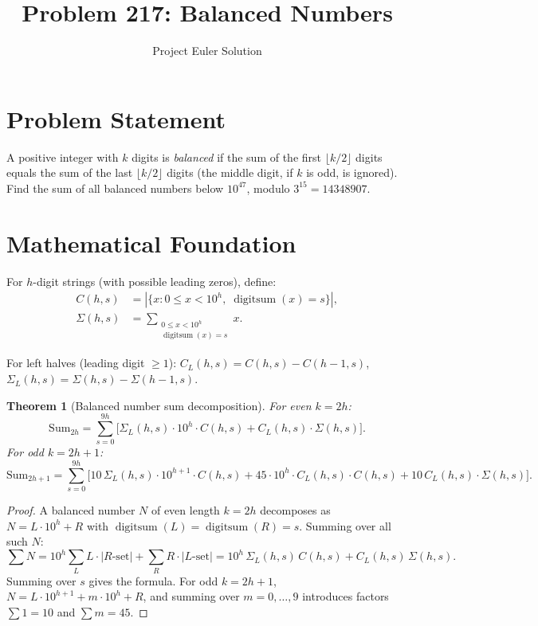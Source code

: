 \documentclass[12pt]{article}
\title{Problem 217: Balanced Numbers}
\author{Project Euler Solution}
\date{}
\newtheorem{theorem}{Theorem}
\begin{document}
\maketitle

\section{Problem Statement}

A positive integer with $k$ digits is \emph{balanced} if the sum of the first $\lfloor k/2\rfloor$ digits equals the sum of the last $\lfloor k/2\rfloor$ digits (the middle digit, if $k$ is odd, is ignored). Find the sum of all balanced numbers below $10^{47}$, modulo $3^{15} = 14348907$.

\section{Mathematical Foundation}

For $h$-digit strings (with possible leading zeros), define:
\begin{align*}
C(h,s) &= |\{x: 0 \leq x < 10^h, \;\operatorname{digitsum}(x) = s\}|, \\
\Sigma(h,s) &= \textstyle\sum_{\substack{0 \leq x < 10^h \\ \operatorname{digitsum}(x)=s}} x.
\end{align*}

For left halves (leading digit $\geq 1$): $C_L(h,s) = C(h,s) - C(h{-}1,s)$, $\Sigma_L(h,s) = \Sigma(h,s) - \Sigma(h{-}1,s)$.

\begin{theorem}[Balanced number sum decomposition]
For even $k = 2h$:
\[
\mathrm{Sum}_{2h} = \sum_{s=0}^{9h}\bigl[\Sigma_L(h,s)\cdot 10^h\cdot C(h,s) + C_L(h,s)\cdot\Sigma(h,s)\bigr].
\]
For odd $k = 2h+1$:
\[
\mathrm{Sum}_{2h+1} = \sum_{s=0}^{9h}\bigl[10\,\Sigma_L(h,s)\cdot 10^{h+1}\cdot C(h,s) + 45\cdot 10^h\cdot C_L(h,s)\cdot C(h,s) + 10\,C_L(h,s)\cdot\Sigma(h,s)\bigr].
\]
\end{theorem}

\begin{proof}
A balanced number $N$ of even length $k=2h$ decomposes as $N = L\cdot 10^h + R$ with $\operatorname{digitsum}(L) = \operatorname{digitsum}(R) = s$. Summing over all such $N$:
\[
\sum N = 10^h\!\sum_L L\cdot|R\text{-set}| + \sum_R R\cdot|L\text{-set}| = 10^h\,\Sigma_L(h,s)\,C(h,s) + C_L(h,s)\,\Sigma(h,s).
\]
Summing over $s$ gives the formula. For odd $k=2h+1$, $N = L\cdot 10^{h+1} + m\cdot 10^h + R$, and summing over $m=0,\ldots,9$ introduces factors $\sum 1 = 10$ and $\sum m = 45$.
\end{proof}
\end{document}

